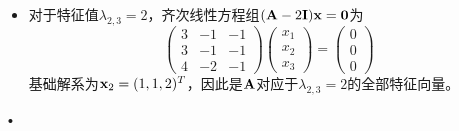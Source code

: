 \begin{frame}
  \begin{footnotesize}
\begin{itemize}
$\lambda_1=3$，齐次线性方程组$(\A-3\II)\xx=\zero$为
    $$
    \left(\begin{array}{rrr}
      2&-1&-1\\
      3&-2&-1\\
      4&-2&-2
      \end{array}\right)\left(
    \begin{array}{c}
      x_1\\
      x_2\\
      x_3
    \end{array}
    \right)=\left(
    \begin{array}{c}
      0\\
      0\\
      0
    \end{array}
    \right)
    $$
    基础解系为$\xx_1=(1,1,1)^T$，因此是$\A$对应于$\lambda_1=3$的全部特征向量。\\[0.1in]
    
\item 
    对于特征值$\lambda_{2,3}=2$，齐次线性方程组$(\mathbf{A}-2\mathbf{I})\mathbf{x}=\mathbf{0}$为
    $$
    \left(\begin{array}{rrr}
      3&-1&-1\\
      3&-1&-1\\
      4&-2&-1
      \end{array}\right)\left(
    \begin{array}{c}
      x_1\\
      x_2\\
      x_3
    \end{array}
    \right)=\left(
    \begin{array}{c}
      0\\
      0\\
      0
    \end{array}
    \right)
    $$
    基础解系为$\mathbf{x}_2=(1,1,2)^T$，因此是$\A$对应于$\lambda_{2,3}=2$的全部特征向量。

\end{itemize}•
    

  \end{footnotesize}
\end{frame}



